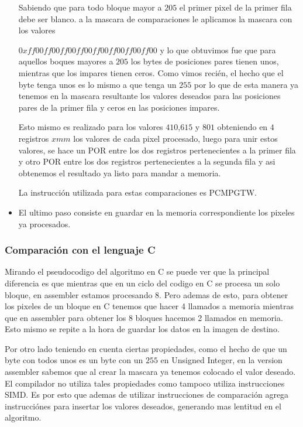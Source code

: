 \begin{itemize}
	Sabiendo que para todo bloque mayor a $205$ el primer pixel de la primer fila debe ser blanco. a la mascara de comparaciones le aplicamos la mascara con los valores  

	$0xff00ff00ff00ff00ff00ff00ff00ff00$ y lo que obtuvimos fue que para aquellos boques mayores a $205$ los bytes de posiciones pares tienen unos, mientras que los impares tienen ceros. Como vimos recién, el hecho que el byte tenga unos es lo mismo a que tenga un $255$ por lo que de esta manera ya tenemos en la mascara resultante los valores deseados para las posiciones pares de la primer fila y ceros en las posiciones impares.

	Esto mismo es realizado para los valores $410$,$615$ y $801$ obteniendo en $4$ registros $xmm$ los valores de cada pixel procesado, luego para unir estos valores, se hace un POR entre los dos registros pertenecientes a la primer fila y otro POR entre los dos registros pertenecientes a la segunda fila y asi obtenemos el resultado ya listo para mandar a memoria.

	La instrucción utilizada para estas comparaciones es PCMPGTW.

	\item El ultimo paso consiste en guardar en la memoria correspondiente los pixeles ya procesados.

\end{itemize}

\subsubsection{Comparación con el lenguaje C}
Mirando el pseudocodigo del algoritmo en C se puede ver que la principal diferencia es que mientras que en un ciclo del codigo en C se procesa un solo bloque, en assembler estamos procesando 8. Pero ademas de esto, para obtener los pixeles de un bloque en C tenemos que hacer 4 llamados a memoria mientras que en assembler para obtener los 8 bloques hacemos 2 llamados en memoria.	Esto mismo se repite a la hora de guardar los datos en la imagen de destino.

Por otro lado teniendo en cuenta ciertas propiedades, como el hecho de que un byte con todos unos es un byte con un $255$ en Unsigned Integer, en la version assembler sabemos que al crear la mascara ya tenemos colocado el valor deseado. El compilador no utiliza tales propiedades como tampoco utiliza instrucciones SIMD. Es por esto que ademas de utilizar instrucciones de comparación agrega instrucciónes para insertar los valores deseados, generando mas lentitud en el algoritmo. 

